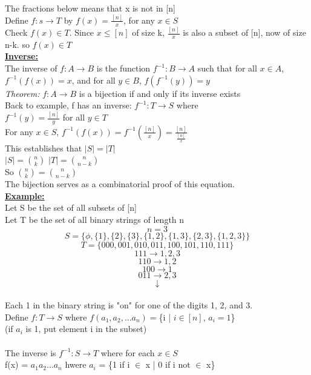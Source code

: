 \documentclass[12pt]{article}
\newcommand{\myt}[1]{\textbf{\underline{#1}}}
\begin{document}
	The fractions below means that x is not in [n]\\
	
	Define $f: s \rightarrow T$ by $f(x) = \frac{[n]}{x}$, for any $x \in S$\\
	Check $f(x) \in T$. Since $x \leq [n]$ of size k, $\frac{[n]}{x}$ is also a subset of [n], now of size n-k. so $f(x) \in T$\\
	
	\myt{Inverse:}\\
	The inverse of $f: A \rightarrow B$ is the function $f^{-1}: B \rightarrow A$ such that for all $x \in A$, $f^{-1}(f(x)) = x$, and for all $y \in B$, $f(f^{-1}(y)) = y$\\
	
	\emph{Theorem: } $f: A \rightarrow B$ is a bijection if and only if its inverse exists\\
	
	Back to example, f has an inverse: $f^{-1}: T \rightarrow S$ where\\
	$f^{-1}(y) = \frac{[n]}{y}$ for all $y \in T$\\
	For any $x \in S$, $f^{-1}(f(x)) = f^{-1}(\frac{[n]}{x}) = \frac{[n]}{\frac{[n]}{x}}$\\
	
	This establishes that $|S| = |T|$ \\ $|S| = {n \choose k}$ $|T| = {n \choose n - k}$\\
	So ${n \choose k} = {n \choose n-k}$\\
	The bijection serves as a combinatorial proof of this equation.\\
	
	\myt{Example:}\\
	Let S be the set of all subsets of [n]\\
	Let T be the set of all binary strings of length n\\
	$$n = 3$$
	$$S = \{\phi, \{1\}, \{2\}, \{3\}, \{1, 2\}, \{1,3\}, \{2,3\}, \{1,2,3\}\}$$
	$$T = \{000, 001, 010, 011, 100, 101, 110, 111\}$$
	$$111 \rightarrow 1,2,3$$
	$$110 \rightarrow 1,2$$
	$$100 \rightarrow 1$$
	$$011 \rightarrow 2,3$$
	$$\downarrow$$\\
	Each 1 in the binary string is "on" for one of the digits 1, 2, and 3.\\
	
	Define $f: T \rightarrow S$ where $f(a_1, a_2, ...a_n) = $\{i | $i \in [n]$, $a_i = 1$\}\\
	(if $a_i$ is 1, put element i in the subset)\\\\
	
	The inverse is $f^{-1}: S \rightarrow T$ where for each $x \in S$\\
	f(x) = $a_1a_2...a_n$ hwere $a_i$ = \{1 if i $\in$ x | 0 if i not $\in$ x\}\\
	
	
	
	
	
	
	
	
\end{document}
